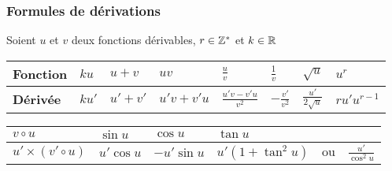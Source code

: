 \begin{example}
\subsubsection*{Formules de dérivations}
Soient $u $ et $v $ deux fonctions dérivables, $ r\in\mathbb{Z}^* $ et $ k\in\mathbb{R} $\\

\begin{tabularx}{\textwidth}{|X|X|X|X|X|X|X|X|}
\hline 
\textbf{\color{magenta}Fonction }& $ ku $ &$ u+v $ & $ uv $ & $\frac{u}{v}$ & $\frac{1}{v} $ & $ \sqrt{u} $ &  $ u^{r} $ \\     
\hline 
\textbf{\color{magenta}Dérivée} & $ ku' $ & $ u'+v' $ & $u'v+ v'u  $ & $ \frac{u'v- v'u }{v^{2}} $ &  $- \frac{v'}{v^{2}} $ & $ \frac{u'}{2\sqrt{u}} $ & $ ru'u^{r-1} $  \\    
\hline
\end{tabularx}

\medskip
\begin{tabularx}{\textwidth}{|X|X|X|X|}
\hline
  $ v\circ u $ & $ \sin u $ & $ \cos u $ & $ \tan u $\\
\hline
$ u'\times (v'\circ u) $  & $ u'\cos u $ & $-u'\sin u$ & $u'( 1+\tan^{2}u) \quad \textrm{ou}\quad \tfrac{u'}{\cos^{2}u}$  \\     
 \hline
\end{tabularx}




\end{example}
